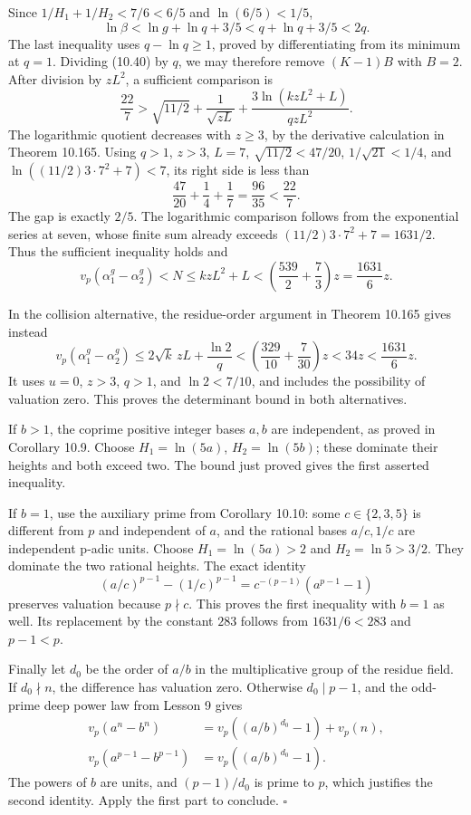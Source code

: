 \documentclass[
  11pt,
  a4paper,
]{article}
\begin{document}
Since \(1/H_1+1/H_2<7/6<6/5\) and \(\ln(6/5)<1/5\), \[
\ln\beta<\ln g+\ln q+3/5
<q+\ln q+3/5<2q.
\tag{10.586}
\] The last inequality uses \(q-\ln q\ge1\), proved by differentiating
from its minimum at \(q=1\). Dividing (10.40) by \(q\), we may therefore
remove \((K-1)B\) with \(B=2\). After division by \(zL^2\), a sufficient
comparison is \[
\frac{22}{7}
\mathrel{>}\sqrt{11/2}+\frac1{\sqrt{zL}}
\mathbin{+}\frac{3\ln(kzL^2+L)}{qzL^2}.
\tag{10.587}
\] The logarithmic quotient decreases with \(z\ge3\), by the derivative
calculation in Theorem 10.165. Using \(q>1\), \(z>3\), \(L=7\),
\(\sqrt{11/2}<47/20\), \(1/\sqrt{21}<1/4\), and
\(\ln((11/2)3\cdot7^2+7)<7\), its right side is less than \[
\frac{47}{20}+\frac14+\frac17
=\frac{96}{35}<\frac{22}{7}.
\tag{10.588}
\] The gap is exactly \(2/5\). The logarithmic comparison follows from
the exponential series at seven, whose finite sum already exceeds
\((11/2)3\cdot7^2+7=1631/2\). Thus the sufficient inequality holds and
\[
v_p(\alpha_1^g-\alpha_2^g)<N
\le kzL^2+L
<\left(\frac{539}{2}+\frac73\right)z
=\frac{1631}{6}z.
\tag{10.589}
\]

In the collision alternative, the residue-order argument in Theorem
10.165 gives instead \[
v_p(\alpha_1^g-\alpha_2^g)
\le2\sqrt{k}\,zL+\frac{\ln2}{q}
<\left(\frac{329}{10}+\frac7{30}\right)z
<34z<\frac{1631}{6}z.
\tag{10.590}
\] It uses \(u=0\), \(z>3\), \(q>1\), and \(\ln2<7/10\), and includes
the possibility of valuation zero. This proves the determinant bound in
both alternatives.

If \(b>1\), the coprime positive integer bases \(a,b\) are independent,
as proved in Corollary 10.9. Choose \(H_1=\ln(5a)\), \(H_2=\ln(5b)\);
these dominate their heights and both exceed two. The bound just proved
gives the first asserted inequality.

If \(b=1\), use the auxiliary prime from Corollary 10.10: some
\(c\in\{2,3,5\}\) is different from \(p\) and independent of \(a\), and
the rational bases \(a/c,1/c\) are independent p-adic units. Choose
\(H_1=\ln(5a)>2\) and \(H_2=\ln5>3/2\). They dominate the two rational
heights. The exact identity \[
(a/c)^{p-1}-(1/c)^{p-1}
=c^{-(p-1)}(a^{p-1}-1)
\tag{10.591}
\] preserves valuation because \(p\nmid c\). This proves the first
inequality with \(b=1\) as well. Its replacement by the constant \(283\)
follows from \(1631/6<283\) and \(p-1<p\).

Finally let \(d_0\) be the order of \(a/b\) in the multiplicative group
of the residue field. If \(d_0\nmid n\), the difference has valuation
zero. Otherwise \(d_0\mid p-1\), and the odd-prime deep power law from
Lesson 9 gives \[
\begin{aligned}
v_p(a^n-b^n)
&=v_p((a/b)^{d_0}-1)+v_p(n),\\
v_p(a^{p-1}-b^{p-1})
&=v_p((a/b)^{d_0}-1).
\end{aligned}
\tag{10.592}
\] The powers of \(b\) are units, and \((p-1)/d_0\) is prime to \(p\),
which justifies the second identity. Apply the first part to conclude.
\(\square\)
\end{document}
